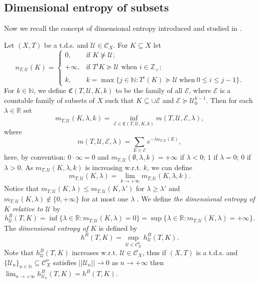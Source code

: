 \documentclass[12pt]{amsart}
\theoremstyle{definition} \theoremstyle{question}
\numberwithin{equation}{section}
\begin{document}
\subsection{Dimensional entropy of subsets}

Now we recall the concept of dimensional entropy introduced and
studied in \cite{B3}.

Let $(X, T)$ be a  t.d.s. and $\mathcal{U}\in \mathcal{C}_X$. For
$K\subseteq X$ let
\[
n_{T, \mathcal{U}} (K)=\left\{
\begin{array}{ll}
0, &\mbox{if $K\nsucceq \mathcal{U}$};\\
+\infty, &\mbox{if $T^i K\succeq \mathcal{U}$ when $i\in \mathbb{Z}_+$};\\
k, &\mbox{$k= \max\{j\in{\mathbb N}: T^i(K)\succeq \mathcal{U}\ \text{when}\
0\le i\le j- 1\}$}.
\end{array}
\right.
\]
For $k\in \mathbb{N}$, we define $\mathfrak{C} (T,\mathcal{U},K, k)$
to be the family of all $\mathcal{E}$, where $\mathcal{E}$ is a
countable family of subsets of $X$ such that $K\subseteq \cup
\mathcal{E}$ and $\mathcal{E}\succeq \mathcal{U}_0^{k-1}$. Then for
each $\lambda\in \mathbb{R}$ set
\begin{equation*}
m_{T, \mathcal{U}} (K, \lambda,k)=\inf_{\mathcal{E}\in \mathfrak{C}
(T, \mathcal{U},K, k)} m (T, \mathcal{U}, \mathcal{E}, \lambda),
\end{equation*}
where $$m (T, \mathcal{U}, \mathcal{E}, \lambda)= \sum_{E\in
\mathcal{E}} e^{-\lambda n_{T, \mathcal{U}} (E)},$$ here, by
convention: $0\cdot \infty= 0$ and
$m_{T,\mathcal{U}}(\emptyset,\lambda, k)= +\infty$ if $\lambda< 0$;
$1$ if $\lambda= 0$; $0$ if $\lambda> 0$. As
$m_{T,\mathcal{U}}(K,\lambda,k)$ is increasing w.r.t. $k$, we can
define
$$m_{T,\mathcal{U}}(K,\lambda)=\lim_{k\rightarrow +\infty}
m_{T, \mathcal{U}} (K, \lambda,k).$$ Notice that
$m_{T,\mathcal{U}}(K,\lambda)\le m_{T,\mathcal{U}}(K,\lambda')$ for
$\lambda\ge \lambda'$ and $m_{T, \mathcal{U}} (K, \lambda)\notin
\{0, +\infty\}$ for at most one $\lambda$ \cite{B3}. We define {\it
the dimensional entropy of $K$ relative to $\mathcal{U}$} by
\begin{equation*}
h^B_\mathcal{U} (T, K)= \inf \{\lambda\in \mathbb{R}: m_{T,
\mathcal{U}} (K, \lambda)= 0\}= \sup \{\lambda \in \mathbb{R}: m_{T,
\mathcal{U}} (K, \lambda)= +\infty\}.
\end{equation*}
The {\it dimensional entropy of $K$} is defined by
$$h^B (T, K)= \sup_{\mathcal{U}\in \mathcal{C}^o_X} h_\mathcal{U}^B (T, K).$$
Note that $h_{\mathcal{U}}^B (T, K)$ increases w.r.t.
$\mathcal{U}\in \mathcal{C}_X$, thus if $(X, T)$ is a t.d.s. and
$\{\mathcal{U}_n\}_{n\in \mathbb{N}}\subseteq \mathcal{C}^o_X$
satisfies $||\mathcal{U}_n||\rightarrow 0$ as $n\rightarrow +\infty$
then $\lim_{n\rightarrow +\infty} h^B_{\mathcal{U}_n} (T, K)=h^B (T,
K)$.
\end{document}

